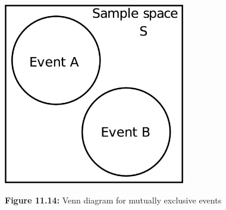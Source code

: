     \setcounter{subfigure}{0}


	\begin{figure}[H] %
    \begin{center}
    \label{m39377*id6899!!!underscore!!!media}\label{m39377*id6899!!!underscore!!!printimage}\includegraphics[width=300px]{col11306.imgs/m39377_mutualexclusive.png} %
        
      \vspace{2pt}
    \vspace{\rubberspace}\par \begin{cnxcaption}
	  \small \textbf{Figure 11.14: }Venn diagram for mutually exclusive events
	\end{cnxcaption}
      
    \vspace{.1in}
    
    \end{center}

 \end{figure}   

    \addtocounter{footnote}{-0}
    
\par \label{m39377*secfhsst!!!underscore!!!id1048}

